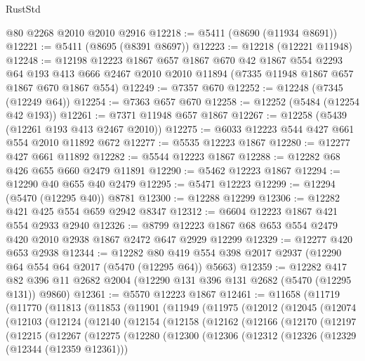 \begin{lexlean}{RustStd}
\begin{coremodule}
{\begin{coremodule}
{{{{{{{{{{{{{{{{{{{{{{{{{{{{{{{    @80
    @2268
    @2010
    @2010
    @2916
@12218 := @5411 (@8690 (@11934 @8691))
@12221 := @5411 (@8695 (@8391 @8697))
@12223 := @12218 (@12221 @11948)
@12248 := @12198
    @12223
    @1867
    @657
    @1867
    @670
    @42
    @1867
    @554
    @2293
    @64
    @193
    @413
    @666
    @2467
    @2010
    @2010
    @11894
    (@7335 @11948 @1867 @657 @1867 @670 @1867 @554)
@12249 := @7357 @670
@12252 := @12248 (@7345 (@12249 @64))
@12254 := @7363 @657 @670
@12258 := @12252 (@5484 (@12254 @42 @193))
@12261 := @7371 @11948 @657 @1867
@12267 := @12258 (@5439 (@12261 @193 @413 @2467 @2010))
@12275 := @6033 @12223 @544 @427 @661 @554 @2010 @11892 @672
@12277 := @5535 @12223 @1867
@12280 := @12277 @427 @661 @11892
@12282 := @5544 @12223 @1867
@12288 := @12282 @68 @426 @655 @660 @2479 @11891
@12290 := @5462 @12223 @1867
@12294 := @12290 @40 @655 @40 @2479
@12295 := @5471 @12223
@12299 := @12294 (@5470 (@12295 @40)) @8781
@12300 := @12288 @12299
@12306 := @12282 @421 @425 @554 @659 @2942 @8347
@12312 := @6604 @12223 @1867 @421 @554 @2933 @2940
@12326 := @8799 @12223 @1867 @68 @653 @554 @2479 @420 @2010 @2938 @1867 @2472 @647 @2929 @12299
@12329 := @12277 @420 @653 @2938
@12344 := @12282
    @80
    @419
    @554
    @398
    @2017
    @2937
    (@12290 @64 @554 @64 @2017 (@5470 (@12295 @64)) @5663)
@12359 := @12282
    @417
    @82
    @396
    @11
    @2682
    @2004
    (@12290 @131 @396 @131 @2682 (@5470 (@12295 @131)) @9860)
@12361 := @5570 @12223 @1867
@12461 := @11658
    (@11719
      (@11770
        (@11813
          (@11853
            (@11901
              (@11949
                (@11975
                  (@12012
                    (@12045
                      (@12074
                        (@12103
                          (@12124
                            (@12140
                              (@12154
                                (@12158
                                  (@12162
                                    (@12166
                                      (@12170
                                        (@12197
                                          (@12215
                                            (@12267
                                              (@12275
                                                (@12280
                                                  (@12300
                                                    (@12306
                                                      (@12312
                                                        (@12326
                                                          (@12329 (@12344 (@12359 @12361)))
}}}}}}}}}}}}}}}}}}}}}}}}}}}}}}}
\end{coremodule}}
\end{coremodule}
\end{lexlean}
